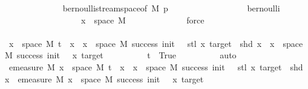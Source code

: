 \begin{isabellebody}
\ \ \ \ \ \ \ \ \ \ \ \ \isamarkupfalse%
\ bernoulli{\isacharunderscore}{\kern0pt}stream{\isacharunderscore}{\kern0pt}space{\isacharbrackleft}{\kern0pt}of\ M\ p{\isacharbrackright}{\kern0pt}\isanewline
\ \ \ \ \ \ \ \ \ \ \ \ \ \ \ \ \ \ bernoulli\isanewline
\ \ \ \ \ \ \ \ \ \ \ \ \ \ \ \ \ \ {\isacartoucheopen}x\ {\isasymin}\ space\ M{\isacartoucheclose}\isanewline
\ \ \ \ \ \ \ \ \ \ \ \ \isamarkupfalse%
\ force\isanewline
\ \ \ \ \ \ \ \ \isamarkupfalse%
\isanewline
\ \ \ \ \ \ \isamarkupfalse%
\ \isanewline
\ \ \ \ \ \ \isamarkupfalse%
\ \isamarkupfalse%
\ {\isachardoublequoteopen}{\isacharbraceleft}{\kern0pt}x\ {\isasymin}\ space\ M{\isachardot}{\kern0pt}\ t\ {\isacharhash}{\kern0pt}{\isacharhash}{\kern0pt}\ x\ {\isasymin}\ {\isacharbraceleft}{\kern0pt}x\ {\isasymin}\ space\ M{\isachardot}{\kern0pt}\ success\ {\isacharparenleft}{\kern0pt}init\ {\isacharplus}{\kern0pt}\ {}{\isacharparenright}{\kern0pt}\ {\isacharparenleft}{\kern0pt}stl\ x{\isacharparenright}{\kern0pt}\ target\ {\isasymand}\ shd\ x{\isacharbraceright}{\kern0pt}{\isacharbraceright}{\kern0pt}\ {\isacharequal}{\kern0pt}\ {\isacharbraceleft}{\kern0pt}x\ {\isasymin}\ space\ M{\isachardot}{\kern0pt}\ success\ {\isacharparenleft}{\kern0pt}init\ {\isacharplus}{\kern0pt}\ {}{\isacharparenright}{\kern0pt}\ x\ target{\isacharbraceright}{\kern0pt}{\isachardoublequoteclose}\isanewline
\ \ \ \ \ \ \ \ \isamarkupfalse%
\ {\isacartoucheopen}t\ {\isacharequal}{\kern0pt}\ True{\isacartoucheclose}\isanewline
\ \ \ \ \ \ \ \ \isamarkupfalse%
\ auto\isanewline
\ \ \ \ \ \ \isamarkupfalse%
\ \isamarkupfalse%
\ {\isachardoublequoteopen}emeasure\ M\ {\isacharbraceleft}{\kern0pt}x\ {\isasymin}\ space\ M{\isachardot}{\kern0pt}\ t\ {\isacharhash}{\kern0pt}{\isacharhash}{\kern0pt}\ x\ {\isasymin}\ {\isacharbraceleft}{\kern0pt}x\ {\isasymin}\ space\ M{\isachardot}{\kern0pt}\ success\ {\isacharparenleft}{\kern0pt}init\ {\isacharplus}{\kern0pt}\ {}{\isacharparenright}{\kern0pt}\ {\isacharparenleft}{\kern0pt}stl\ x{\isacharparenright}{\kern0pt}\ target\ {\isasymand}\ shd\ x{\isacharbraceright}{\kern0pt}{\isacharbraceright}{\kern0pt}\ {\isacharequal}{\kern0pt}\ emeasure\ M\ {\isacharbraceleft}{\kern0pt}x\ {\isasymin}\ space\ M{\isachardot}{\kern0pt}\ success\ {\isacharparenleft}{\kern0pt}init\ {\isacharplus}{\kern0pt}\ {}{\isacharparenright}{\kern0pt}\ x\ target{\isacharbraceright}{\kern0pt}{\isachardoublequoteclose}\isanewline

\end{isabellebody}
